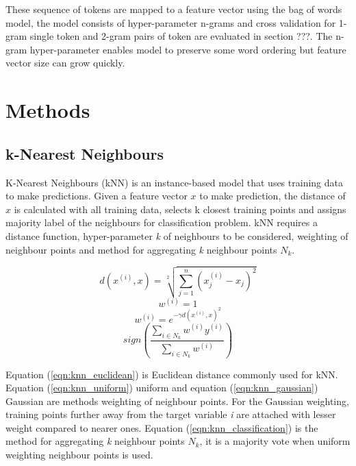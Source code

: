 \documentclass[transmag]{IEEEtran}
\begin{document}
\noindent These sequence of tokens are mapped to a feature vector using the bag of words model, the model consists of hyper-parameter n-grams and cross validation for 1-gram single token and 2-gram pairs of token are evaluated in section ???. The n-gram hyper-parameter enables model to preserve some word ordering but feature vector size can grow quickly.

\section{Methods}

\subsection{k-Nearest Neighbours }
\noindent K-Nearest Neighbours (kNN) is an instance-based model that uses training data to make predictions. Given a feature vector $x$ to make prediction, the distance of $x$ is calculated with all training data, selects k closest training points and assigns majority label of the neighbours for classification problem. kNN requires a distance function, hyper-parameter \emph{k} of neighbours to be considered, weighting of neighbour points and method for aggregating \emph{k} neighbour points $N_k$. 


\begin{equation}
\label{eqn:knn_euclidean}
d(x^{(i)},x) = \sqrt[2]{ \sum^n_{j=1} (x^{(i)}_j - x_j)^2 }
\end{equation}
\begin{equation}
\label{eqn:knn_uniform}
w^{(i)} = 1
\end{equation}
\begin{equation}
\label{eqn:knn_gaussian}
w^{(i)} = e^{-\gamma d(x^{(i)},x)^2}
\end{equation}
\begin{equation}
\label{eqn:knn_classification}
sign(\frac{ \sum_{i \in N_k} w^{(i)} y^{(i)} }{ \sum_{ i \in N_k} w^{(i)} })
\end{equation}

\noindent Equation (\ref{eqn:knn_euclidean}) is Euclidean distance commonly used for kNN.
Equation (\ref{eqn:knn_uniform}) uniform and equation (\ref{eqn:knn_gaussian}) Gaussian are methods weighting of neighbour points. For the Gaussian weighting, training points further away from the target variable \emph{i} are attached with lesser weight compared to nearer ones. Equation (\ref{eqn:knn_classification}) is the method for aggregating \emph{k} neighbour points $N_k$, it is a majority vote when uniform weighting neighbour points is used.
\end{document}

